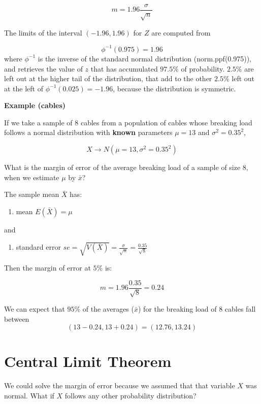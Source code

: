 \documentclass[
]{book}
\providecommand{\tightlist}{%
  \setlength{\itemsep}{0pt}\setlength{\parskip}{0pt}}
\begin{document}
\[m=1.96\frac{\sigma}{\sqrt{n}}\]

The limits of the interval \((-1.96, 1.96)\) for \(Z\) are computed from

\[\phi^{-1}(0.975)=1.96\]
where \(\phi^{-1}\) is the inverse of the standard normal distribution (norm.ppf(0.975)), and retrieves the value of \(z\) that has accumulated \(97.5\%\) of probability. \(2.5\%\) are left out at the higher tail of the distribution, that add to the other \(2.5\%\) left out at the left of \(\phi^{-1}(0.025)=-1.96\), because the distribution is symmetric.

\textbf{Example (cables)}

If we take a sample of \(8\) cables from a population of cables whose breaking load follows a normal distribution with \textbf{known} parameters \(\mu=13\) and \(\sigma^2=0.35^2\),

\[X \rightarrow N(\mu=13, \sigma^2=0.35^2)\]

What is the margin of error of the average breaking load of a sample of size \(8\), when we estimate \(\mu\) by \(\bar{x}\)?

The sample mean \(\bar{X}\) has:

\begin{enumerate}
\def\labelenumi{\arabic{enumi}.}
\tightlist
\item
  mean \(E(\bar{X})=\mu\)
\end{enumerate}

and

\begin{enumerate}
\def\labelenumi{\arabic{enumi}.}
\setcounter{enumi}{1}
\tightlist
\item
  standard error \(se=\sqrt{V(\bar{X})}=\frac{\sigma}{\sqrt{n}}=\frac{0.35}{\sqrt{8}}\)
\end{enumerate}

Then the margin of error at \(5\%\) is:

\[m=1.96\frac{0.35}{\sqrt{8}}=0.24\]

We can expect that \(95\%\) of the averages (\(\bar{x}\)) for the breaking load of \(8\) cables fall between \[(13-0.24, 13+0.24)=(12.76, 13.24)\]

\hypertarget{central-limit-theorem-1}{%
\section{Central Limit Theorem}\label{central-limit-theorem-1}}

We could solve the margin of error because we assumed that that variable \(X\) was normal. What if \(X\) follows any other probability distribution?
\end{document}
